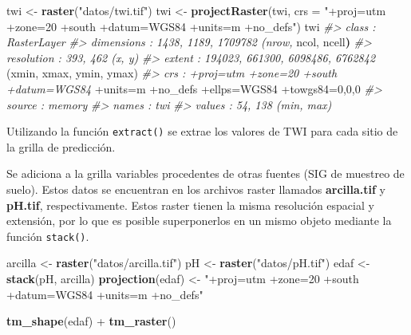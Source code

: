 \documentclass[11pt,b5paper,]{krantz}
\newenvironment{Shaded}{}{}
\newcommand{\KeywordTok}[1]{\textcolor[rgb]{0.00,0.44,0.13}{\textbf{#1}}}
\newcommand{\DataTypeTok}[1]{\textcolor[rgb]{0.56,0.13,0.00}{#1}}
\newcommand{\DecValTok}[1]{\textcolor[rgb]{0.25,0.63,0.44}{#1}}
\newcommand{\StringTok}[1]{\textcolor[rgb]{0.25,0.44,0.63}{#1}}
\newcommand{\CommentTok}[1]{\textcolor[rgb]{0.38,0.63,0.69}{\textit{#1}}}
\newcommand{\OperatorTok}[1]{\textcolor[rgb]{0.40,0.40,0.40}{#1}}
\newcommand{\ErrorTok}[1]{\textcolor[rgb]{1.00,0.00,0.00}{\textbf{#1}}}
\newcommand{\NormalTok}[1]{#1}
\begin{document}
\begin{Shaded}
\begin{Highlighting}[]
\NormalTok{twi <-}\StringTok{ }\KeywordTok{raster}\NormalTok{(}\StringTok{"datos/twi.tif"}\NormalTok{)}
\NormalTok{twi <-}
\StringTok{  }\KeywordTok{projectRaster}\NormalTok{(twi, }
                \DataTypeTok{crs =} \StringTok{"+proj=utm +zone=20 +south}
\StringTok{                +datum=WGS84 +units=m +no_defs"}\NormalTok{)}
\NormalTok{twi}
\CommentTok{#> class : RasterLayer}
\CommentTok{#> dimensions : 1438, 1189, 1709782 (nrow,}
\NormalTok{ncol, ncell}\ErrorTok{)}
\CommentTok{#> resolution : 393, 462 (x, y)}
\CommentTok{#> extent : 194023, 661300, 6098486, 6762842}
\NormalTok{(xmin, xmax, ymin, ymax)}
\CommentTok{#> crs : +proj=utm +zone=20 +south +datum=WGS84}
\OperatorTok{+}\NormalTok{units=m }\OperatorTok{+}\NormalTok{no_defs }\OperatorTok{+}\NormalTok{ellps=WGS84 }\OperatorTok{+}\NormalTok{towgs84=}\DecValTok{0}\NormalTok{,}\DecValTok{0}\NormalTok{,}\DecValTok{0}
\CommentTok{#> source : memory}
\CommentTok{#> names : twi}
\CommentTok{#> values : 54, 138 (min, max)}
\end{Highlighting}
\end{Shaded}

Utilizando la función \texttt{extract()} se extrae los valores de TWI
para cada sitio de la grilla de predicción.

\begin{Shaded}
\end{Shaded}

Se adiciona a la grilla variables procedentes de otras fuentes (SIG de
muestreo de suelo). Estos datos se encuentran en los archivos raster
llamados \textbf{arcilla.tif} y \textbf{pH.tif}, respectivamente. Estos
raster tienen la misma resolución espacial y extensión, por lo que es
posible superponerlos en un mismo objeto mediante la función
\texttt{stack()}.

\begin{Shaded}
\begin{Highlighting}[]
\NormalTok{arcilla <-}\StringTok{ }\KeywordTok{raster}\NormalTok{(}\StringTok{"datos/arcilla.tif"}\NormalTok{)}
\NormalTok{pH <-}\StringTok{ }\KeywordTok{raster}\NormalTok{(}\StringTok{"datos/pH.tif"}\NormalTok{)}
\NormalTok{edaf <-}\StringTok{ }\KeywordTok{stack}\NormalTok{(pH, arcilla)}
\KeywordTok{projection}\NormalTok{(edaf) <-}
\StringTok{  "+proj=utm +zone=20 +south}
\StringTok{   +datum=WGS84 +units=m +no_defs"}

\KeywordTok{tm_shape}\NormalTok{(edaf) }\OperatorTok{+}
\StringTok{  }\KeywordTok{tm_raster}\NormalTok{()}
\end{Highlighting}
\end{Shaded}
\end{document}
